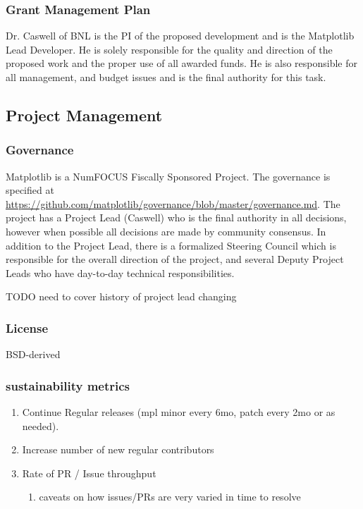 \documentclass[12pt]{article}
\numberwithin{page}{section}
\begin{document}
\subsubsection{Grant Management Plan}

Dr. Caswell of BNL is the PI of the proposed development and is the
Matplotlib Lead Developer.  He is solely responsible for the quality
and direction of the proposed work and the proper use of all awarded
funds.  He is also responsible for all management, and budget issues
and is the final authority for this task.


\subsection{Project Management}
\subsubsection{Governance}
Matplotlib is a NumFOCUS Fiscally Sponsored Project.  The governance
is specified at
\url{https://github.com/matplotlib/governance/blob/master/governance.md}.
The project has a Project Lead (Caswell) who is the final authority in
all decisions, however when possible all decisions are made by
community consensus.  In addition to the Project Lead, there is a
formalized Steering Council which is responsible for the overall
direction of the project, and several Deputy Project Leads who have
day-to-day technical responsibilities.

TODO need to cover history of project lead changing

\subsubsection{License}

BSD-derived

\subsubsection{sustainability metrics}
\begin{enumerate}
\item Continue Regular releases (mpl minor every 6mo, patch every 2mo
  or as needed).
\item Increase number of new regular contributors
\item Rate of PR / Issue throughput
  \begin{enumerate}
  \item caveats on how issues/PRs are very varied in time to resolve
  \end{enumerate}
\end{enumerate}
\end{document}
